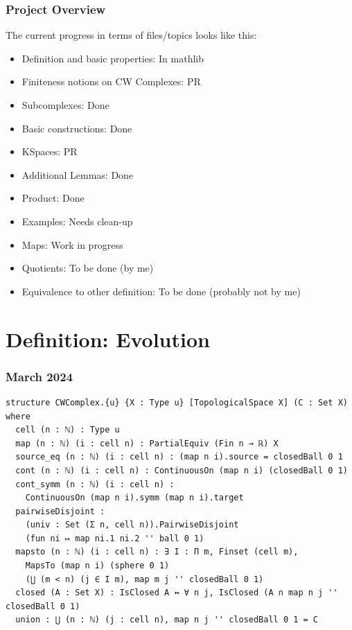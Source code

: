 \documentclass{beamer}
\begin{document}
\begin{frame}
  \frametitle{Project Overview}
  \fontsize{10pt}{5}\selectfont
  The current progress in terms of files/topics looks like this:
  \begin{itemize}
    \item[\textcolor{Green}{\textbullet}] Definition and basic properties: In mathlib
    \item[\textcolor{Yellow}{\textbullet}] Finiteness notions on CW Complexes: PR
    \item[\textcolor{YellowOrange}{\textbullet}] Subcomplexes: Done
    \item[\textcolor{YellowOrange}{\textbullet}] Basic constructions: Done 
    \item[\textcolor{Yellow}{\textbullet}] KSpaces: PR
    \item[\textcolor{YellowOrange}{\textbullet}] Additional Lemmas: Done
    \item[\textcolor{YellowOrange}{\textbullet}] Product: Done
    \item[\textcolor{Orange}{\textbullet}] Examples: Needs clean-up
    \item[\textcolor{Orange}{\textbullet}] Maps: Work in progress
    \item[\textcolor{Red}{\textbullet}] Quotients: To be done (by me)
    \item[\textcolor{BrickRed}{\textbullet}] Equivalence to other definition: To be done (probably not by me)
  \end{itemize}
\end{frame}

\section{Definition: Evolution}

\begin{frame}[fragile]
\frametitle{March 2024}
\begin{lstlisting}[basicstyle=\ttfamily\scriptsize]
structure CWComplex.{u} {X : Type u} [TopologicalSpace X] (C : Set X) where
  cell (n : ℕ) : Type u
  map (n : ℕ) (i : cell n) : PartialEquiv (Fin n → ℝ) X
  source_eq (n : ℕ) (i : cell n) : (map n i).source = closedBall 0 1
  cont (n : ℕ) (i : cell n) : ContinuousOn (map n i) (closedBall 0 1)
  cont_symm (n : ℕ) (i : cell n) : 
    ContinuousOn (map n i).symm (map n i).target
  pairwiseDisjoint :
    (univ : Set (Σ n, cell n)).PairwiseDisjoint 
    (fun ni ↦ map ni.1 ni.2 '' ball 0 1)
  mapsto (n : ℕ) (i : cell n) : ∃ I : Π m, Finset (cell m),
    MapsTo (map n i) (sphere 0 1) 
    (⋃ (m < n) (j ∈ I m), map m j '' closedBall 0 1)
  closed (A : Set X) : IsClosed A ↔ ∀ n j, IsClosed (A ∩ map n j '' closedBall 0 1)
  union : ⋃ (n : ℕ) (j : cell n), map n j '' closedBall 0 1 = C
\end{lstlisting}
\end{frame}
\end{document}
